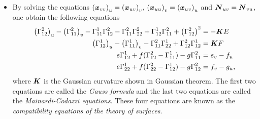 \documentclass[11pt]{article}
\begin{document}
\begin{itemize}
\item By solving the equations $\left(\boldsymbol{x}_{vv}\right)_{u} = \left(\boldsymbol{x}_{uv}\right)_{v} $, $\left(\boldsymbol{x}_{uu}\right)_{v} = \left(\boldsymbol{x}_{uv}\right)_{u}$ and $\boldsymbol{N}_{uv} = \boldsymbol{N}_{vu}$, one obtain the following equations
\begin{align}
\left(\Gamma_{12}^{2}\right)_{u}- \left(\Gamma_{11}^{2}\right)_{v} - \Gamma_{11}^{1}\Gamma_{12}^{2} - \Gamma_{11}^{2}\Gamma_{22}^{2} + \Gamma_{12}^{1}\Gamma_{11}^{2} +\left(\Gamma_{12}^{2}\right)^{2}
&= -\boldsymbol{K}E \nonumber\\
\left(\Gamma_{12}^{1}\right)_{u}-\left(\Gamma_{11}^{1}\right)_{v} -   \Gamma_{11}^{2}\Gamma_{22}^{1}  + \Gamma_{12}^{2}\Gamma_{12}^{1}
&= \boldsymbol{K}F \nonumber\\
 e\Gamma_{12}^{1} + f(\Gamma_{12}^{2} - \Gamma_{11}^{1}) - g\Gamma_{11}^{2}&= e_{v} - f_{u}  \nonumber\\
 e\Gamma_{22}^{1} + f(\Gamma_{22}^{2} - \Gamma_{12}^{1}) - g\Gamma_{12}^{2}&= f_{v} - g_{u},  \label{eqn: comp_eqn_surface_formula}
\end{align} 
where $\boldsymbol{K}$ is the Gaussian curvature shown in Gaussian theorem. The first two equations are called the \emph{Gauss formula} and the last two equations are called the \emph{Mainardi-Codazzi equations}.  These four equations are known as the \emph{compatibility equations of the theory of surfaces}. \\[20pt]


\end{itemize}
\end{document}
